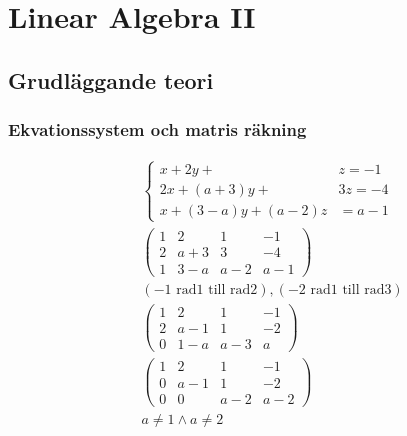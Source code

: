 \chapter{Linear Algebra II}

\newpage



\begin{multicols}{2}
\section{Grudläggande teori} %
\subsection{Ekvationssystem och matris räkning}
\begin{align*}
  &\quad \left\{\begin{array}{rr}
  x+2 y+ & z=-1 \\
  2 x+(a+3) y+ & 3 z=-4 \\
  x+(3-a) y+(a-2) z & =a-1
  \end{array}\right. \\
  &\quad \left(\begin{array}{ccc|c}
    1 & 2 & 1 & -1 \\
    2 & a+3 & 3 & -4 \\
    1 & 3-a & a-2 & a-1
  \end{array}\right) \\
  &\quad (-1 \text{ rad1 till rad2}), (-2 \text{ rad1 till rad3}) \\
  &\quad \left(\begin{array}{ccc|c}
    1 & 2 & 1 & -1 \\
    2 & a-1 & 1 & -2 \\
    0 & 1-a & a-3 & a
  \end{array}\right) \\
  &\quad \left(\begin{array}{ccc|c}
    1 & 2 & 1 & -1 \\
    0 & a-1 & 1 & -2 \\
    0 & 0 & a-2 & a-2
  \end{array}\right) \\
  &\quad a \neq 1 \land a \neq 2 \\

\end{align*}
\end{multicols}
